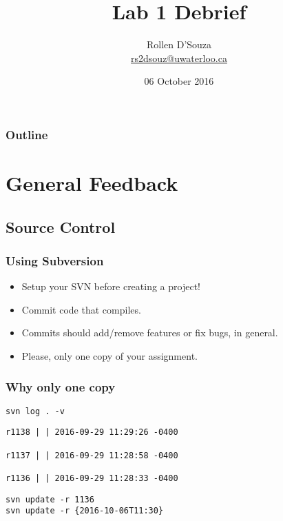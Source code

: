 \documentclass{beamer}
\begin{document}
\title{Lab 1 Debrief}
\author[Rollen]{Rollen D'Souza \\ \url{rs2dsouz@uwaterloo.ca}}
\date{06 October 2016}

\begin{frame}
	\titlepage
\end{frame}

\begin{frame}
	\frametitle{Outline}
	\tableofcontents
\end{frame}

\section{General Feedback}
\subsection{Source Control}
\begin{frame}
	\frametitle{Using Subversion}
	\begin{itemize}
		\item Setup your SVN \alert{before} creating a project! \pause
		\item Commit code that compiles. \pause
		\item Commits should add/remove features or fix bugs, in general. \pause
		\item Please, only one copy of your assignment.
	\end{itemize}
\end{frame}
\begin{frame}[fragile]
	\frametitle{Why only one copy}
	\begin{example}
		\texttt{svn log . -v}
		\begin{verbatim}
r1138 | | 2016-09-29 11:29:26 -0400 

r1137 | | 2016-09-29 11:28:58 -0400

r1136 | | 2016-09-29 11:28:33 -0400
		\end{verbatim}
	\end{example}
	\pause
	\begin{example}
		\texttt{svn update -r 1136}\\
		\texttt{svn update -r \{2016-10-06T11:30\}}
	\end{example}
\end{frame}
\end{document}

